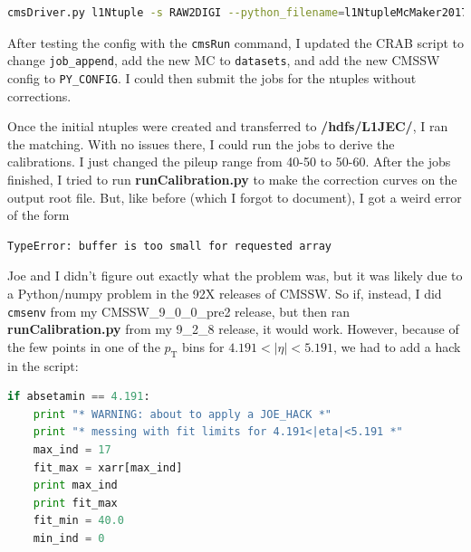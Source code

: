 \begin{lstlisting}[belowskip=-0.7cm, language=sh, numbers=none]
cmsDriver.py l1Ntuple -s RAW2DIGI --python_filename=l1NtupleMcMaker2017_RAW2DIGI_v3.py -n 420 --no_output --era=Run2_2017 --mc --conditions=92X_upgrade2017_realistic_v7 --customise=L1Trigger/Configuration/customiseReEmul.L1TReEmulMCFrom90xRAWSimHcalTP --customise=L1Trigger/L1TNtuples/customiseL1Ntuple.L1NtupleRAWEMUGEN_MC --customise=L1Trigger/Configuration/customiseSettings.L1TSettingsToCaloStage2Params_2017_v1_10_mode_inconsistent --filein=/store/mc/RunIISummer17DRStdmix/QCD_Pt-15to3000_TuneCUETP8M1_Flat_13TeV_pythia8/GEN-SIM-RAW/NZSFlatPU28to62_92X_upgrade2017_realistic_v10-v1/10000/00052042-ED9E-E711-A959-FA163E22945C.root
\end{lstlisting}

After testing the config with the \texttt{cmsRun} command, I updated the CRAB script to change \texttt{job\_append}, add the new MC to \texttt{datasets}, and add the new CMSSW config to \texttt{PY\_CONFIG}. I could then submit the jobs for the ntuples without corrections.

Once the initial ntuples were created and transferred to \textbf{/hdfs/L1JEC/}, I ran the matching. With no issues there, I could run the jobs to derive the calibrations. I just changed the pileup range from 40-50 to 50-60. After the jobs finished, I tried to run \textbf{runCalibration.py} to make the correction curves on the output root file. But, like before (which I forgot to document), I got a weird error of the form

\begin{lstlisting}[belowskip=-0.7cm, language=sh, numbers=none]
TypeError: buffer is too small for requested array
\end{lstlisting}

Joe and I didn't figure out exactly what the problem was, but it was likely due to a Python/numpy problem in the 92X releases of CMSSW. So if, instead, I did \texttt{cmsenv} from my CMSSW\_9\_0\_0\_pre2 release, but then ran \textbf{runCalibration.py} from my 9\_2\_8 release, it would work. However, because of the few points in one of the $p_{\mathrm{T}}$ bins for $4.191 < |\eta| < 5.191$, we had to add a hack in the script:

\begin{lstlisting}[belowskip=-0.7cm, language=python, numbers=none]
if absetamin == 4.191:
    print "* WARNING: about to apply a JOE_HACK *"
    print "* messing with fit limits for 4.191<|eta|<5.191 *"
    max_ind = 17
    fit_max = xarr[max_ind]
    print max_ind
    print fit_max
    fit_min = 40.0
    min_ind = 0
\end{lstlisting}

